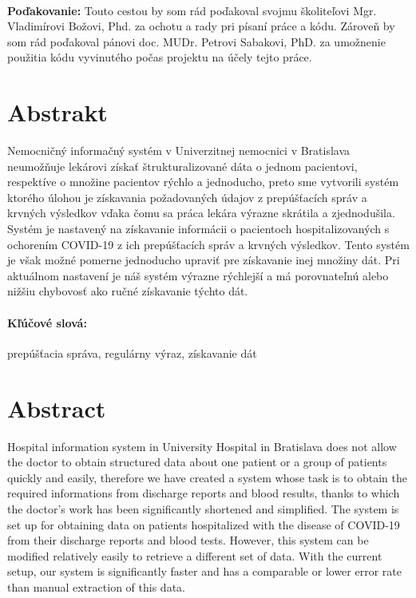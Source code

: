 \documentclass[12pt, twoside]{book}
\begin{document}


\newpage 
\pagestyle{plain}
~

\vfill
{\bf Poďakovanie:} Touto cestou by som rád poďakoval svojmu školiteľovi Mgr. Vladimírovi Božovi, Phd. za ochotu a rady pri písaní práce a kódu. Zároveň by som rád poďakoval pánovi doc. MUDr. Petrovi Sabakovi, PhD. za umožnenie použitia kódu vyvinutého počas projektu na účely tejto práce.  


\newpage 
\section*{Abstrakt}


Nemocničný informačný systém v Univerzitnej nemocnici v Bratislava neumožňuje lekárovi získať štrukturalizované dáta o jednom pacientovi, respektíve o množine pacientov rýchlo a jednoducho, preto sme vytvorili systém ktorého úlohou je získavania požadovaných údajov z prepúšťacích správ a krvných výsledkov vďaka čomu sa práca lekára výrazne skrátila a zjednodušila. Systém je nastavený na získavanie informácii o pacientoch hospitalizovaných s ochorením COVID-19 z ich prepúšťacích správ a krvných výsledkov. Tento systém je však možné pomerne jednoducho upraviť pre získavanie inej množiny dát. Pri aktuálnom nastavení je náš systém výrazne rýchlejší a má porovnateľnú alebo nižšiu chybovosť ako ručné získavanie týchto dát.  

\paragraph*{Kľúčové slová:} prepúšťacia správa, regulárny výraz, získavanie dát


\newpage 
\section*{Abstract}

Hospital information system in University Hospital in Bratislava does not allow the doctor to obtain structured data about one patient or a group of patients quickly and easily, therefore we have created a system whose task is to obtain the required informations from discharge reports and blood results, thanks to which the doctor's work has been significantly shortened and simplified. The system is set up for obtaining data on patients hospitalized with the disease of COVID-19 from their discharge reports and blood tests. However, this system can be modified relatively easily to retrieve a different set of data. With the current setup, our system is significantly faster and has a comparable or lower error rate than manual extraction of this data.
\end{document}
